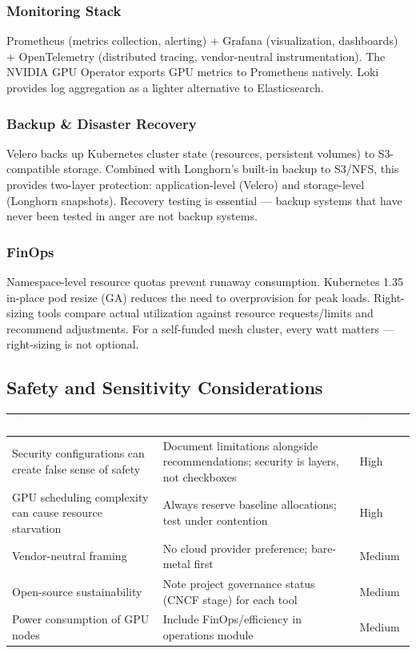 \documentclass[11pt,letterpaper]{article}
\newcommand{\tableheader}[1]{\textbf{\sffamily\textcolor{white}{#1}}}
\begin{document}
\subsubsection{Monitoring Stack}
Prometheus (metrics collection, alerting) + Grafana (visualization, dashboards) + OpenTelemetry (distributed tracing, vendor-neutral instrumentation). The NVIDIA GPU Operator exports GPU metrics to Prometheus natively. Loki provides log aggregation as a lighter alternative to Elasticsearch.

\subsubsection{Backup \& Disaster Recovery}
Velero backs up Kubernetes cluster state (resources, persistent volumes) to S3-compatible storage. Combined with Longhorn's built-in backup to S3/NFS, this provides two-layer protection: application-level (Velero) and storage-level (Longhorn snapshots). Recovery testing is essential --- backup systems that have never been tested in anger are not backup systems.

\subsubsection{FinOps}
Namespace-level resource quotas prevent runaway consumption. Kubernetes 1.35 in-place pod resize (GA) reduces the need to overprovision for peak loads. Right-sizing tools compare actual utilization against resource requests/limits and recommend adjustments. For a self-funded mesh cluster, every watt matters --- right-sizing is not optional.

\subsection{Safety and Sensitivity Considerations}

\begin{center}
\begin{tabularx}{\textwidth}{L{3.5cm}XC{2cm}}
\toprule
{}
\tableheader{Consideration} & \tableheader{Mitigation} & \tableheader{Priority} \\
\midrule
Security configurations can create false sense of safety & Document limitations alongside recommendations; security is layers, not checkboxes & High \\
GPU scheduling complexity can cause resource starvation & Always reserve baseline allocations; test under contention & High \\
Vendor-neutral framing & No cloud provider preference; bare-metal first & Medium \\
Open-source sustainability & Note project governance status (CNCF stage) for each tool & Medium \\
Power consumption of GPU nodes & Include FinOps/efficiency in operations module & Medium \\
\bottomrule
\end{tabularx}
\end{center}
\end{document}
